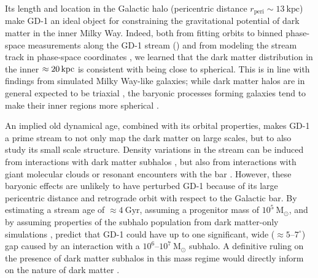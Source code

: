 \documentclass[modern]{aastex62}
\newcommand{\msun}{\textrm{M}_\odot}
\newcommand{\kpc}{\textrm{kpc}}
\begin{document}
Its length and location in the
Galactic halo (pericentric distance $r_\textrm{peri} \sim 13~\kpc$) make GD-1 an
ideal object for constraining the gravitational potential of dark matter in the
inner Milky Way.
Indeed, both from fitting orbits to binned phase-space measurements along the
GD-1 stream (\citealt{Koposov:2010}) and from modeling the stream track in
phase-space coordinates \citep{Bowden:2015, Bovy:2016}, we learned that the
dark matter distribution in the inner $\approx20\,\rm kpc$ is consistent with being close to
spherical.
This is in line with findings from simulated Milky Way-like galaxies; while dark matter halos are in general expected to be triaxial \citep{Allgood:2006}, the baryonic processes forming galaxies tend to make their inner regions more spherical \citep{Zhu:2016}.

An implied old dynamical age, combined with its orbital properties, makes GD-1 a prime stream to not only map the dark matter on large scales, but to also study its small scale structure.
Density variations in the stream can be induced from interactions with dark matter subhalos \citep[e.g.,][]{Ngan:2014}, but also from interactions with giant molecular clouds \citep{Amorisco:2016} or resonant encounters with the bar \citep{Pearson:2017}.
However, these baryonic effects are unlikely to have perturbed GD-1 because of its large pericentric distance and retrograde orbit with respect to
the Galactic bar.
By estimating a stream age of $\approx 4~\textrm{Gyr}$, assuming a progenitor
mass of $10^5~\msun$, and by assuming properties of the subhalo population from dark matter-only simulations \citep[scaled to the Milky Way halo mass of $10^{12}\,\msun$, and reduced in number by a factor of 3 to account for disruption by the Galactic disk]{Springel:2008, Diemand:2008}, \citet{Erkal:2016} predict that GD-1 could have up to one significant, wide
($\approx 5$--$7^\circ$) gap caused by an interaction with a
$10^6$--$10^7~\msun$ subhalo.
A definitive ruling on the presence of dark matter subhalos in this mass regime would directly inform on the nature of dark matter \citep[e.g.][]{Bullock:2017}.
\end{document}
